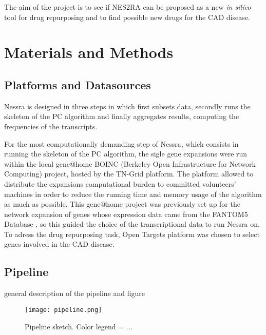\documentclass[fleqn,10pt]{SelfArx} %
\begin{document}
The aim of the project is to see if NES2RA can be proposed as a new \textit{in silico} tool for drug repurposing and to find possible new drugs for the CAD disease.  


\section*{Materials and Methods}



\subsection*{Platforms and Datasources}

Nessra is designed in three steps in which first subsets data,
secondly runs the skeleton of the PC algorithm and finally aggregates results, computing the frequencies of the transcripts.

For the most computationally demanding step of Nessra, which consists in running the skeleton of the PC algorithm, the sigle gene expansions were run within the local gene@home \cite{boinc} BOINC (Berkeley Open Infrastructure for Network Computing) project, hosted by the TN-Grid platform. 
The platform allowed to distribute the expansions computational burden to committed volunteers' machines in order to reduce the running time and memory usage of the algorithm as much as possible.
This gene@home project was previously set up for the network expansion of genes whose expression data came from the FANTOM5 Database \cite{fantom}, so this guided the choice of the transcriptional data to run Nessra on.
To adress the drug repurposing task, Open Targets\cite{open} platform was chosen to select genes involved in the CAD disease.  


\subsection*{Pipeline}


general description of the pipeline and figure

\begin{figure}
	\texttt{[image: pipeline.png]}
	\caption{Pipeline sketch. Color legend = ...}
\end{figure}
\end{document}
